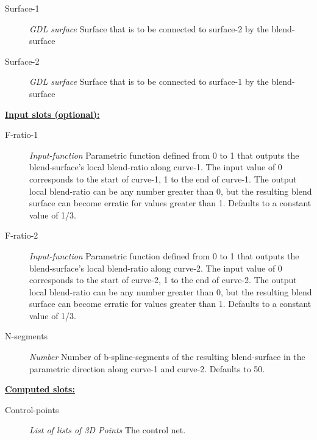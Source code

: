 \documentclass [11pt]{book}
\begin{document}
\begin{itemize}
\begin{description}
\item [Surface-1]
\emph{GDL surface} Surface that is to be connected to surface-2 by the blend-surface


\item [Surface-2]
\emph{GDL surface} Surface that is to be connected to surface-1 by the blend-surface


\end{description}






\textbf{
\underline{Input slots (optional):}}

\begin{description}

\item [F-ratio-1]
\emph{Input-function} Parametric function defined from 0 to 1 that outputs the blend-surface's local blend-ratio along curve-1. The input value of 0 corresponds to the start of curve-1, 1 to the end of curve-1. The output local blend-ratio can be any number greater than 0, but the resulting blend surface can become erratic for values greater than 1. Defaults to a constant value of 1/3.


\item [F-ratio-2]
\emph{Input-function} Parametric function defined from 0 to 1 that outputs the blend-surface's local blend-ratio along curve-2. The input value of 0 corresponds to the start of curve-2, 1 to the end of curve-2. The output local blend-ratio can be any number greater than 0, but the resulting blend surface can become erratic for values greater than 1. Defaults to a constant value of 1/3.


\item [N-segments]
\emph{Number} Number of b-spline-segments of the resulting blend-surface in the parametric direction along curve-1 and curve-2. Defaults to 50.


\end{description}






\textbf{
\underline{Computed slots:}}

\begin{description}

\item [Control-points]
\emph{List of lists of 3D Points} The control net.



\end{description}
\end{itemize}
\end{document}
